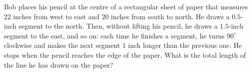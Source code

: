 Bob places his pencil at the centre of a rectangular sheet of paper that measures $22$ inches from west to east and $20$ inches from south to north. He draws a $0.5$-inch segment to the north. Then, without lifting his pencil, he draws a $1.5$-inch segment to the east, and so on: each time he finishes a segment, he turns $90^\circ$ clockwise and makes the next segment $1$ inch longer than the previous one. He stops when the pencil reaches the edge of the paper. What is the total length of the line he has drawn on the paper?
